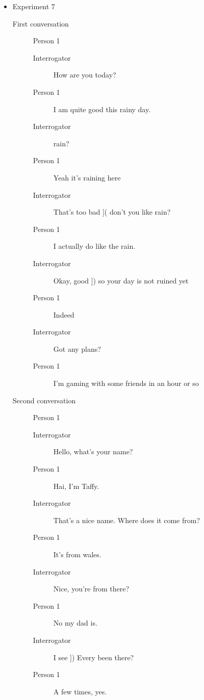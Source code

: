 \begin{itemize}
\item Experiment 7
   \begin{description}
      \item [First conversation] Person 1
         \begin{description}
            \item [Interrogator] How are you today?
            \item [Person 1] I am quite good this rainy day.
            \item [Interrogator] rain?
            \item [Person 1] Yeah it's raining here
         \item [Interrogator] That's too bad ]( don't you like rain?
         \item [Person 1] I actually do like the rain.
      \item [Interrogator] Okay, good ]) so your day is not ruined yet
      \item [Person 1] Indeed
      \item [Interrogator] Got any plans?
      \item [Person 1] I'm gaming with some friends in an hour or so
   \end{description}
\item [Second conversation] Person 1
   \begin{description}
      \item [Interrogator] Hello, what's your name?
      \item [Person 1] Hai, I'm Taffy.
      \item [Interrogator] That's a nice name. Where does it come from?
      \item [Person 1] It's from wales.
      \item [Interrogator] Nice, you're from there?
      \item [Person 1] No my dad is.
   \item [Interrogator] I see ]) Every been there?
   \item [Person 1] A few times, yes.
\end{description}
      \end{description}


\end{itemize}
